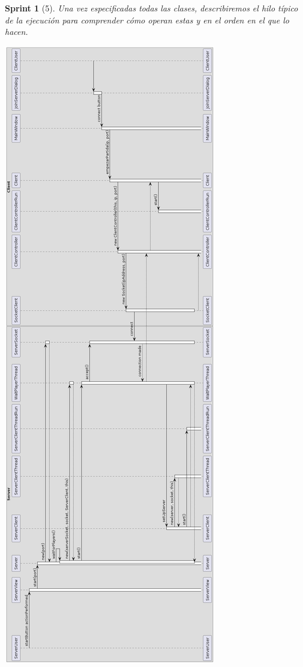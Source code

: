 \documentclass{article}
\theoremstyle{break}
\newtheorem*{sprint}{Sprint}
\begin{document}
\begin{sprint}[5]
Una vez especificadas todas las clases, describiremos el hilo típico de la ejecución para comprender cómo operan estas y en el orden en el que lo hacen.

\begin{center}
\includegraphics[scale=0.4]{umlconexiones.png}
\end{center}


\end{sprint}
\end{document}
